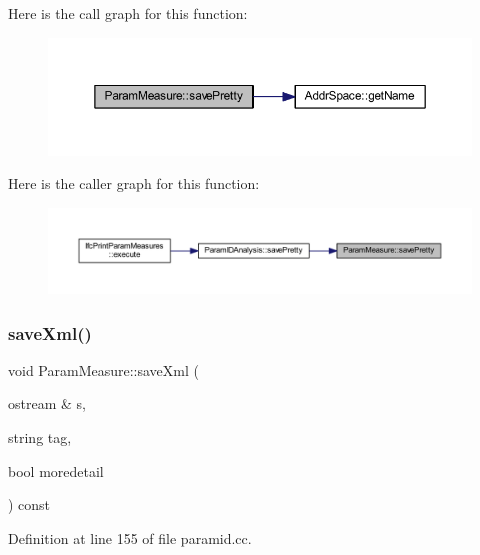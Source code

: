 Here is the call graph for this function\+:
\nopagebreak
\begin{figure}[H]
\begin{center}
\leavevmode
\includegraphics[width=350pt]{class_param_measure_a3f7a68d5a3978a999dd0690308710655_cgraph}
\end{center}
\end{figure}
Here is the caller graph for this function\+:
\nopagebreak
\begin{figure}[H]
\begin{center}
\leavevmode
\includegraphics[width=350pt]{class_param_measure_a3f7a68d5a3978a999dd0690308710655_icgraph}
\end{center}
\end{figure}
\mbox{\label{class_param_measure_a53d9f454f92708e2e61a60c83222fe7a}} 
\subsubsection{\texorpdfstring{saveXml()}{saveXml()}}
{\footnotesize\ttfamily void Param\+Measure\+::save\+Xml (\begin{DoxyParamCaption}\item[{ostream \&}]{s,  }\item[{string}]{tag,  }\item[{bool}]{moredetail }\end{DoxyParamCaption}) const}



Definition at line 155 of file paramid.\+cc.

